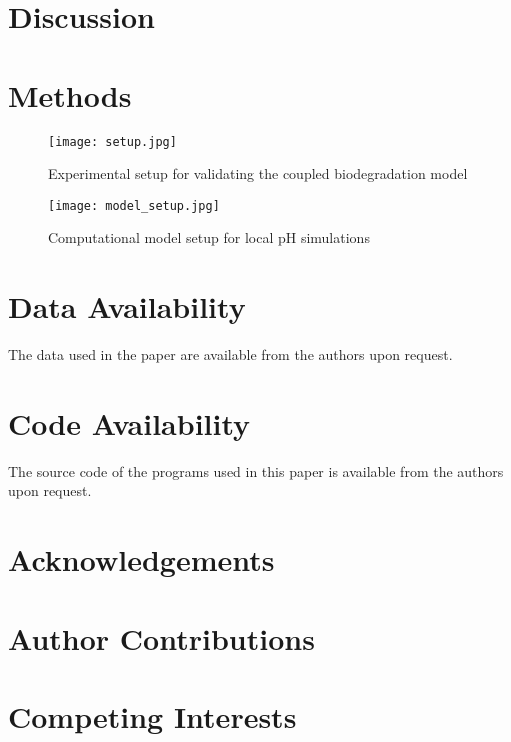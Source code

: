 \section{Discussion}

\section{Methods}

\begin{figure}[h]
\centering
\medskip
\texttt{[image: setup.jpg]}
\caption[Experimental setup for validating the coupled biodegradation model]{Experimental setup for validating the coupled biodegradation model} \label{fig:kinetics_setup}
\end{figure}


\begin{figure}[h]
\centering
\medskip
\texttt{[image: model\_setup.jpg]}
\caption[Computational model setup for local pH simulations]{Computational model setup for local pH simulations} \label{fig:kinetics_model_setup}
\end{figure}



\section{Data Availability}

The data used in the paper are available from the authors upon request.

\section{Code Availability}
The source code of the programs used in this paper is available from the authors upon request.


\section{Acknowledgements}

\section{Author Contributions}

\section{Competing Interests}


\cleardoublepage

